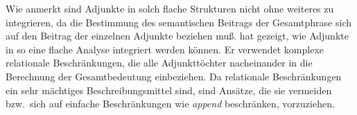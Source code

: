 Wie \citet[]{Netter92} anmerkt sind Adjunkte in solch flache Strukturen nicht ohne weiteres zu
integrieren, da die Bestimmung des semantischen Beitrags der Gesamtphrase sich auf den Beitrag
der einzelnen Adjunkte beziehen muß. \citet{Kasper94a} hat gezeigt, wie Adjunkte in so eine flache
Analyse integriert werden können. Er verwendet komplexe relationale Beschränkungen, die alle
Adjunkttöchter nacheinander in die Berechnung der Gesamtbedeutung einbeziehen. Da relationale
Beschränkungen ein sehr mächtiges Beschreibungsmittel sind, sind Ansätze, die sie vermeiden bzw.\
sich auf einfache Beschränkungen wie \emph{append} beschränken, vorzuziehen.

